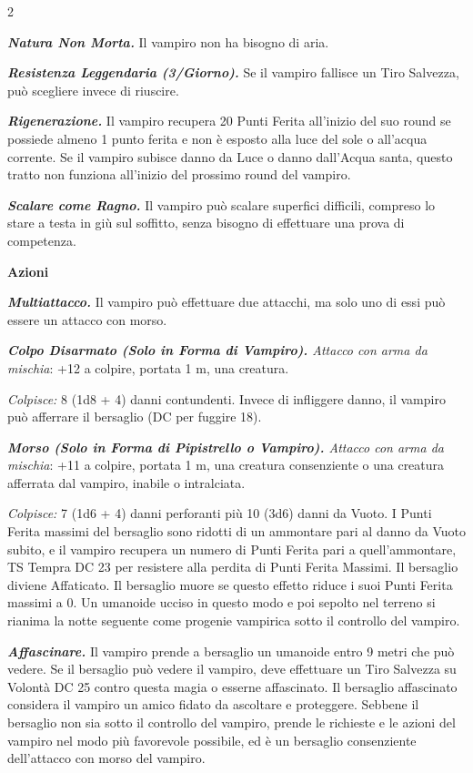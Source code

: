 \begin{multicols}{2}
{\emph{\textbf{Natura Non Morta.}} Il vampiro non ha bisogno di aria.

\emph{\textbf{Resistenza Leggendaria (3/Giorno).}} Se il vampiro fallisce un Tiro Salvezza, può scegliere invece di riuscire.

\emph{\textbf{Rigenerazione.}} Il vampiro recupera 20 Punti Ferita all'inizio del suo round se possiede almeno 1 punto ferita e non è esposto alla luce del sole o all'acqua corrente. Se il vampiro subisce danno da Luce o danno dall'Acqua santa, questo tratto non funziona all'inizio del prossimo round del vampiro.

\emph{\textbf{Scalare come Ragno.}} Il vampiro può scalare superfici difficili, compreso lo stare a testa in giù sul soffitto, senza bisogno di effettuare una prova di competenza.

\textbf{Azioni}

\emph{\textbf{Multiattacco.}} Il vampiro può effettuare due attacchi, ma solo uno di essi può essere un attacco con morso.

\emph{\textbf{Colpo Disarmato (Solo in Forma di Vampiro).} Attacco con arma da mischia}: +12 a colpire, portata 1 m, una creatura.

\emph{Colpisce:} 8 (1d8 + 4) danni contundenti. Invece di infliggere danno, il vampiro può afferrare il bersaglio (DC per fuggire 18).

\emph{\textbf{Morso (Solo in Forma di Pipistrello o Vampiro).} Attacco con arma da mischia}: +11 a colpire, portata 1 m, una creatura consenziente o una creatura afferrata dal vampiro, inabile o intralciata.

\emph{Colpisce:} 7 (1d6 + 4) danni perforanti più 10 (3d6) danni da Vuoto. I Punti Ferita massimi del bersaglio sono ridotti di un ammontare pari al danno da Vuoto subito, e il vampiro recupera un numero di Punti Ferita pari a quell'ammontare, TS Tempra DC 23 per resistere alla perdita di Punti Ferita Massimi. Il bersaglio diviene Affaticato. Il bersaglio muore se questo effetto riduce i suoi Punti Ferita massimi a 0. Un umanoide ucciso in questo modo e poi sepolto nel terreno si rianima la notte seguente come progenie vampirica sotto il controllo del vampiro.

\emph{\textbf{Affascinare.}} Il vampiro prende a bersaglio un umanoide entro 9 metri che può vedere. Se il bersaglio può vedere il vampiro, deve effettuare un Tiro Salvezza su Volontà DC 25 contro questa magia o esserne affascinato. Il bersaglio affascinato considera il vampiro un amico fidato da ascoltare e proteggere. Sebbene il bersaglio non sia sotto il controllo del vampiro, prende le richieste e le azioni del vampiro nel modo più favorevole possibile, ed è un bersaglio consenziente dell'attacco con morso del vampiro.

}
\end{multicols}
